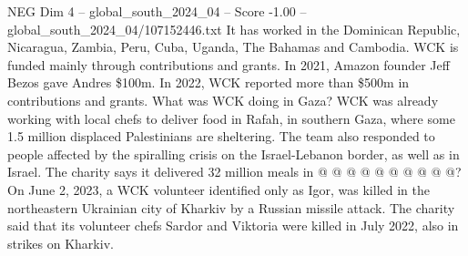 \begin{textsample}{NEG Dim 4 – global\_south\_2024\_04 – Score -1.00 – global\_south\_2024\_04/107152446.txt}
It has worked in the Dominican Republic, Nicaragua, Zambia, Peru, Cuba, Uganda, The Bahamas and Cambodia.
WCK is funded mainly through contributions and grants.
In 2021, Amazon founder Jeff Bezos gave Andres \$100m.
In 2022, WCK reported more than \$500m in contributions and grants.
What was WCK doing in Gaza?
WCK was already working with local chefs to deliver food in Rafah, in southern Gaza, where some 1.5 million displaced Palestinians are sheltering.
The team also responded to people affected by the spiralling crisis on the Israel-Lebanon border, as well as in Israel.
The charity says it delivered 32 million meals in @ @ @ @ @ @ @ @ @ @?
On June 2, 2023, a WCK volunteer identified only as Igor, was killed in the northeastern Ukrainian city of Kharkiv by a Russian missile attack.
The charity said that its volunteer chefs Sardor and Viktoria were killed in July 2022, also in strikes on Kharkiv.

\end{textsample}
